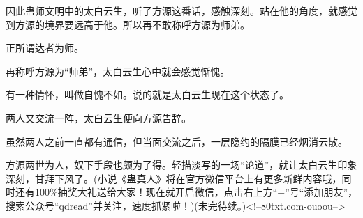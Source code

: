 \begin{this_body}
因此蛊师文明中的太白云生，听了方源这番话，感触深刻。站在他的角度，就感觉到方源的境界要远高于他。所以再不敢称呼方源为师弟。

正所谓达者为师。

再称呼方源为“师弟”，太白云生心中就会感觉惭愧。

有一种情怀，叫做自愧不如。说的就是太白云生现在这个状态了。

两人又交流一阵，太白云生便向方源告辞。

虽然两人之前一直都有通信，但当面交流之后，一层隐约的隔膜已经烟消云散。

方源两世为人，奴下手段也颇为了得。轻描淡写的一场“论道”，就让太白云生印象深刻，甘拜下风了。(小说《蛊真人》将在官方微信平台上有更多新鲜内容哦，同时还有100\%抽奖大礼送给大家！现在就开启微信，点击右上方“+”号“添加朋友”，搜索公众号“qdread”并关注，速度抓紧啦！)(未完待续。)<!--80txt.com-ouoou-->

\end{this_body}

